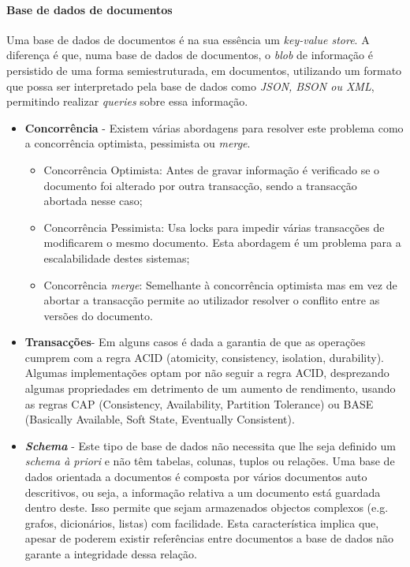 \documentclass[]{article}
\begin{document}
\paragraph{Base de dados de documentos}
Uma base de dados de documentos é na sua essência um \emph{key-value store}. A diferença é que, numa base de dados de documentos, o \emph{blob} de informação é persistido de uma forma semiestruturada, em documentos, utilizando um formato que possa ser interpretado pela base de dados como \emph{JSON\cite{json}, BSON ou XML}, permitindo realizar \emph{queries} sobre essa informação.\\
\begin{itemize}
\item
\textbf{Concorrência} - Existem várias abordagens para resolver este problema como a concorrência optimista, pessimista ou \emph{merge}. \begin{itemize}
\item
Concorrência Optimista: Antes de gravar informação é verificado se o documento foi alterado por outra transacção, sendo a transacção abortada nesse caso;
\item
Concorrência Pessimista: Usa locks para impedir várias transacções de modificarem o mesmo documento. Esta abordagem é um problema para a escalabilidade destes sistemas;
\item
Concorrência
\emph{merge}: Semelhante à concorrência optimista mas em vez de abortar a transacção permite ao utilizador resolver o conflito entre as versões do documento.
\end{itemize}
\item
\textbf{Transacções}- Em alguns casos é dada a garantia de que as operações cumprem com a regra ACID (atomicity, consistency, isolation, durability). Algumas implementações optam por não seguir a regra ACID, desprezando algumas propriedades em detrimento de um aumento de rendimento, usando as regras CAP (Consistency, Availability, Partition Tolerance) ou BASE (Basically Available, Soft State, Eventually Consistent).
\item
\textbf{\emph{Schema}} - Este tipo de base de dados não necessita que lhe seja definido um \emph{schema à priori} e não têm tabelas, colunas, tuplos ou relações. Uma base de dados orientada a documentos é composta por vários documentos auto descritivos, ou seja, a informação relativa a um documento está guardada dentro deste. Isso permite que sejam armazenados objectos complexos (e.g. grafos, dicionários, listas) com facilidade. Esta característica implica que, apesar de poderem existir referências entre documentos a base de dados não garante a integridade dessa relação.

\end{itemize}
\end{document}
